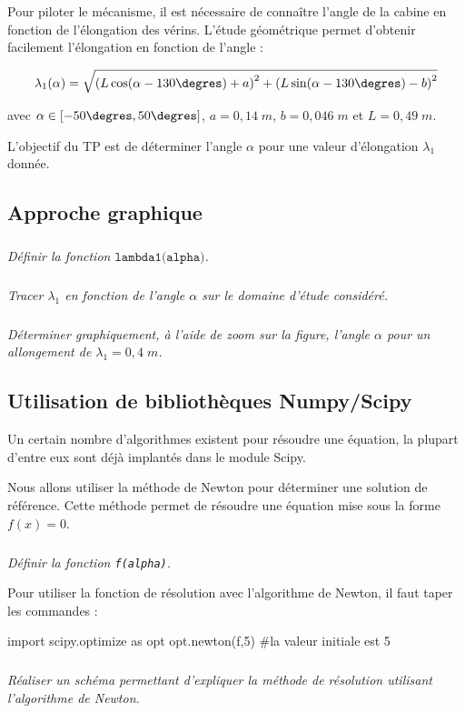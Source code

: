 \documentclass[10pt]{article}
\begin{document}
Pour piloter le mécanisme, il est nécessaire de connaître l'angle de la cabine en fonction de l'élongation des vérins. L'étude géométrique permet d'obtenir facilement l'élongation en fonction de l'angle :

$$\lambda_1(\alpha) = \sqrt{\left(L\cos(\alpha-130\degres)  +a\right)^2+\left(L\sin(\alpha-{130}{\degres})-b\right)^2} $$ 

avec $\alpha\in[{-50}{\degres}, {50}{\degres}]$, $a = {0,14}{\; m}$, $b = {0,046}{\; m}$ et $L = {0,49}{\; m}$.
\begin{obj}
L'objectif du TP est de déterminer l'angle $\alpha$ pour une valeur d'élongation $\lambda_1$ donnée.
\end{obj}
\subsection{Approche graphique}

\subparagraph{}\textit{Définir la fonction $\texttt{lambda1(alpha)}$.}

\subparagraph{}\textit{Tracer $\lambda_1$ en fonction de l'angle $\alpha$ sur le domaine d'étude considéré.}

\subparagraph{}\textit{Déterminer graphiquement, à l'aide de zoom sur la figure, l'angle $\alpha$ pour un allongement de $\lambda_1={0,4}{\; m}$.}

\subsection{Utilisation de bibliothèques Numpy/Scipy}
Un certain nombre d'algorithmes existent pour résoudre une équation, la plupart d'entre eux sont déjà implantés dans le module Scipy.

Nous allons utiliser la méthode de Newton pour déterminer une solution de référence. Cette méthode permet de résoudre une équation mise sous la forme $f(x) = 0$.

\subparagraph{}\textit{Définir la fonction \texttt{f(alpha)}.}

Pour utiliser la fonction de résolution avec l'algorithme de Newton, il faut taper les commandes :
\begin{py}
\begin{python}
import scipy.optimize as opt
opt.newton(f,5)  #la valeur initiale est 5
\end{python}
\end{py}

\subparagraph{}
\textit{Réaliser un schéma permettant d'expliquer la méthode de résolution utilisant l'algorithme de Newton.}
\end{document}
